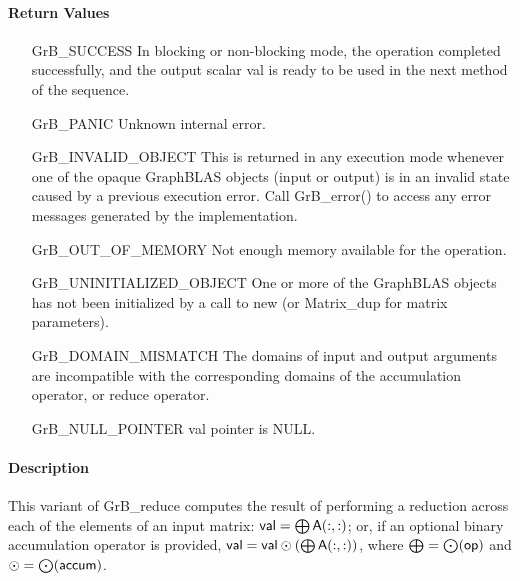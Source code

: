 \paragraph{Return Values}

\begin{itemize}[leftmargin=2.1in]
    \item[{\sf GrB\_SUCCESS}]         In blocking or non-blocking mode, 
    the operation completed successfully, and the
    output scalar {\sf val} is ready to be used in the next method of 
    the sequence.

    \item[{\sf GrB\_PANIC}]           Unknown internal error.

    \item[{\sf GrB\_INVALID\_OBJECT}] This is returned in any execution mode 
    whenever one of the opaque GraphBLAS objects (input or output) is in an invalid 
    state caused by a previous execution error.  Call {\sf GrB\_error()} to access 
    any error messages generated by the implementation.

    \item[{\sf GrB\_OUT\_OF\_MEMORY}] Not enough memory available for the operation.

    \item[{\sf GrB\_UNINITIALIZED\_OBJECT}] One or more of the GraphBLAS objects 
    has not been initialized by a call to {\sf new} (or {\sf Matrix\_dup} for matrix
    parameters).
    
    \item[{\sf GrB\_DOMAIN\_MISMATCH}]    The domains of input and output arguments are
    incompatible with the corresponding domains of the accumulation operator, 
    or reduce operator.

    \item[{\sf GrB\_NULL\_POINTER}]  {\sf val} pointer is {\sf NULL}.
\end{itemize}

\paragraph{Description}

This variant of {\sf GrB\_reduce} computes the result of performing
a reduction across each of the elements of an input matrix:
${\sf val} = \bigoplus {\sf A}(:,:)$; or, if an optional binary accumulation 
operator is provided, ${\sf val} = {\sf val} \odot (\bigoplus {\sf A}(:,:))$, 
where $\bigoplus = \bigodot({\sf op})$ and $\odot = \bigodot({\sf accum})$.  

